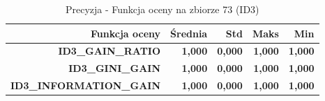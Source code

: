 \begin{table}[htbp]
\centering
\small
\setlength{\tabcolsep}{6pt}
\renewcommand{\arraystretch}{1.2}
\caption{Precyzja - Funkcja oceny na zbiorze 73 (ID3)}
\label{tab:ID3_eval_function_73_precision}
\begin{tabular}{r|r|r|r|r}
\toprule
Funkcja oceny & Średnia & Std & Maks & Min \\
\hline
\textbf{ID3\_GAIN\_RATIO} & \textbf{1,000} & \textbf{0,000} & \textbf{1,000} & \textbf{1,000} \\
\textbf{ID3\_GINI\_GAIN} & \textbf{1,000} & \textbf{0,000} & \textbf{1,000} & \textbf{1,000} \\
\textbf{ID3\_INFORMATION\_GAIN} & \textbf{1,000} & \textbf{0,000} & \textbf{1,000} & \textbf{1,000} \\
\bottomrule
\end{tabular}
\end{table}